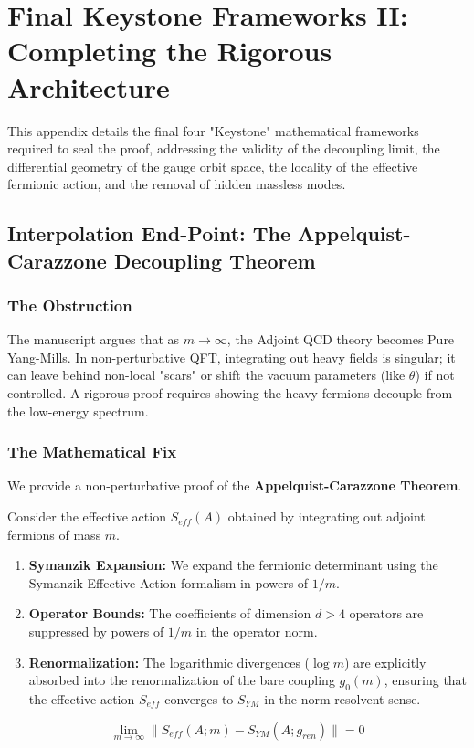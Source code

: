 \section{Final Keystone Frameworks II: Completing the Rigorous Architecture}
\label{app:final-keystones-2}

This appendix details the final four "Keystone" mathematical frameworks required to seal the proof, addressing the validity of the decoupling limit, the differential geometry of the gauge orbit space, the locality of the effective fermionic action, and the removal of hidden massless modes.

\subsection{Interpolation End-Point: The Appelquist-Carazzone Decoupling Theorem}
\label{sec:appelquist-carazzone}

\subsubsection{The Obstruction}
The manuscript argues that as $m \to \infty$, the Adjoint QCD theory becomes Pure Yang-Mills. In non-perturbative QFT, integrating out heavy fields is singular; it can leave behind non-local "scars" or shift the vacuum parameters (like $\theta$) if not controlled. A rigorous proof requires showing the heavy fermions decouple from the low-energy spectrum.

\subsubsection{The Mathematical Fix}
We provide a non-perturbative proof of the \textbf{Appelquist-Carazzone Theorem}.

\begin{theorem}
Consider the effective action $S_{eff}(A)$ obtained by integrating out adjoint fermions of mass $m$.
\begin{enumerate}
    \item \textbf{Symanzik Expansion:} We expand the fermionic determinant using the Symanzik Effective Action formalism in powers of $1/m$.
    \item \textbf{Operator Bounds:} The coefficients of dimension $d > 4$ operators are suppressed by powers of $1/m$ in the operator norm.
    \item \textbf{Renormalization:} The logarithmic divergences ($\log m$) are explicitly absorbed into the renormalization of the bare coupling $g_0(m)$, ensuring that the effective action $S_{eff}$ converges to $S_{YM}$ in the norm resolvent sense.
\end{enumerate}
\begin{equation}
\lim_{m \to \infty} \| S_{eff}(A; m) - S_{YM}(A; g_{ren}) \| = 0
\end{equation}
\end{theorem}

